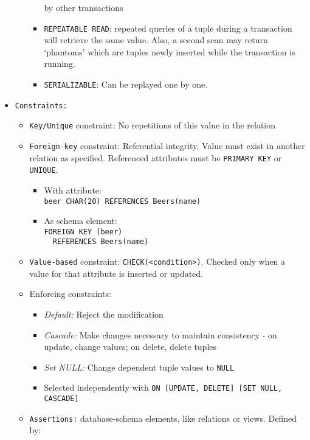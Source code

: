 \documentclass[landscape,8pt]{extarticle}
\newcommand{\code}{\lstinline}
\begin{document}
\begin{multicols}{4}
\begin{itemize}
\begin{itemize}
\begin{itemize}
        by other transactions
        \item \code{REPEATABLE READ}: repeated queries of a tuple during a transaction will retrieve
        the same value. Also, a second scan may return `phantoms' which are tuples newly inserted
        while the transaction is running.
        \item \code{SERIALIZABLE}: Can be replayed one by one.
    \end{itemize}
\end{itemize}
    \item \code{Constraints:}
    \begin{itemize}
        \item \code{Key/Unique} constraint: No repetitions of this value in the relation
        \item \code{Foreign-key} constraint: Referential integrity. Value must exist in another
        relation as specified. Referenced attributes must be \code{PRIMARY KEY} or \code{UNIQUE}.
        \begin{itemize}
            \item With attribute:\\
            \code{beer CHAR(20) REFERENCES Beers(name)}
            \item As schema element:\\
        \code{FOREIGN KEY (beer)}\\
        \code{  REFERENCES Beers(name)}
        \end{itemize}
        \item \code{Value-based} constraint: \code{CHECK(<condition>)}. Checked only when a value
        for that attribute is inserted or updated.
        \item Enforcing constraints:
        \begin{itemize}
            \item \emph{Default:} Reject the modification
            \item \emph{Cascade:} Make changes necessary to maintain consistency - on update, change
            values; on delete, delete tuples
            \item \emph{Set NULL:} Change dependent tuple values to \code{NULL}
            \item Selected independently with \code{ON [UPDATE, DELETE] [SET NULL, CASCADE]}
        \end{itemize}
        \item \code{Assertions:} database-schema elements, like relations or views. Defined by:\\

\end{itemize}
\end{itemize}
\end{multicols}
\end{document}
